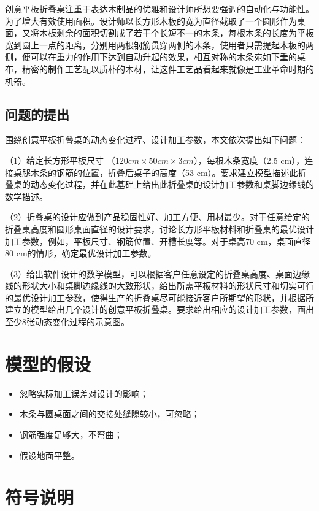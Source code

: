 \documentclass[bwprint]{cumcmthesis}
\begin{document}
创意平板折叠桌注重于表达木制品的优雅和设计师所想要强调的自动化与功能性。为了增大有效使用面积。设计师以长方形木板的宽为直径截取了一个圆形作为桌面，又将木板剩余的面积切割成了若干个长短不一的木条，每根木条的长度为平板宽到圆上一点的距离，分别用两根钢筋贯穿两侧的木条，使用者只需提起木板的两侧，便可以在重力的作用下达到自动升起的效果，相互对称的木条宛如下垂的桌布，精密的制作工艺配以质朴的木材，让这件工艺品看起来就像是工业革命时期的机器。

\subsection{问题的提出}

围绕创意平板折叠桌的动态变化过程、设计加工参数，本文依次提出如下问题：

（1）给定长方形平板尺寸 （$120 cm \times 50 cm \times 3 cm$），每根木条宽度（2.5 cm），连接桌腿木条的钢筋的位置，折叠后桌子的高度（53 cm）。要求建立模型描述此折叠桌的动态变化过程，并在此基础上给出此折叠桌的设计加工参数和桌脚边缘\cite{koopmans2014spectral}线\cite{marks2012advanced}的\cite{wang2005study}数学描述。



（2）折叠桌的设计应做到产品稳固性好、加工方便、用材最少。对于任意给定的折叠桌高度和圆形桌面直径的设计要求，讨论长方形平板材料和折叠桌的最优设计加工参数，例如，平板尺寸、钢筋位置、开槽长度等。对于桌高70 cm，桌面直径80 cm的情形，确定最优设计加工参数。


（3）给出软件设计的数学模型，可以根据客户任意设定的折叠桌高度、桌面边缘线的形状大小和桌脚边缘线的大致形状，给出所需平板材料的形状尺寸和切实可行的最优设计加工参数，使得生产的折叠桌尽可能接近客户所期望的形状，并根据所建立的模型给出几个设计的创意平板折叠桌。要求给出相应的设计加工参数，画出至少8张动态变化过程的示意图。

\section{模型的假设}

\begin{itemize}
\item 忽略实际加工误差对设计的影响；
\item 木条与圆桌面之间的交接处缝隙较小，可忽略；
\item 钢筋强度足够大，不弯曲；
\item 假设地面平整。
\end{itemize}

\section{符号说明}
\end{document}
